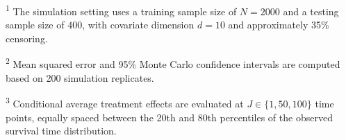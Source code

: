 \documentclass{article}
\begin{document}
\begin{table}[ht]
\begin{threeparttable}
\begin{tablenotes}
        \item \textsuperscript{1} The simulation setting uses a training sample size of $N=2000$ and a testing sample size of $400$, with covariate dimension $d=10$ and approximately 35\% censoring.
        \item \textsuperscript{2} Mean squared error and 95\% Monte Carlo confidence intervals are computed based on 200 simulation replicates.
        \item \textsuperscript{3} Conditional average treatment effects are evaluated at \(J \in \{1, 50, 100\}\) time points, equally spaced between the 20th and 80th percentiles of the observed survival time distribution.
    \end{tablenotes}
    \end{threeparttable}
\end{table}
\end{document}
